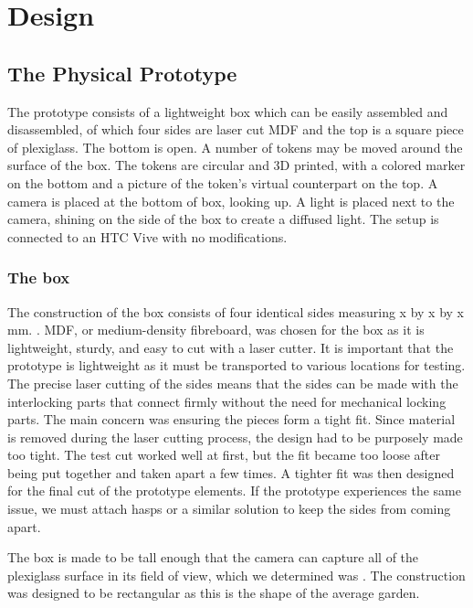 \chapter{Design}

\section{The Physical Prototype}

The prototype consists of a lightweight box which can be easily assembled and disassembled, of which four sides are laser cut MDF and the top is a square piece of plexiglass. The bottom is open. A number of tokens may be moved around the surface of the box. The tokens are circular and 3D printed, with a colored marker on the bottom and a picture of the token's virtual counterpart on the top. A camera is placed at the bottom of box, looking up. A light is placed next to the camera, shining on the side of the box to create a diffused light. 
The setup is connected to an HTC Vive with no modifications.

\subsection{The box}

The construction of the box consists of four identical sides measuring x by x by x mm. . MDF, or medium-density fibreboard, was chosen for the box as it is lightweight, sturdy, and easy to cut with a laser cutter. It is important that the prototype is lightweight as it must be transported to various locations for testing. The precise laser cutting of the sides means that the sides can be made with the interlocking parts that connect firmly without the need for mechanical locking parts. The main concern was ensuring the pieces form a tight fit. Since material is removed during the laser cutting process, the design had to be purposely made too tight. The test cut worked well at first, but the fit became too loose after being put together and taken apart a few times. A tighter fit was then designed for the final cut of the prototype elements. If the prototype experiences the same issue, we must attach hasps or a similar solution to keep the sides from coming apart. 


The box is made to be tall enough that the camera can capture all of the plexiglass surface in its field of view, which we determined was .
The construction was designed to be rectangular as this is the shape of the average garden. %

